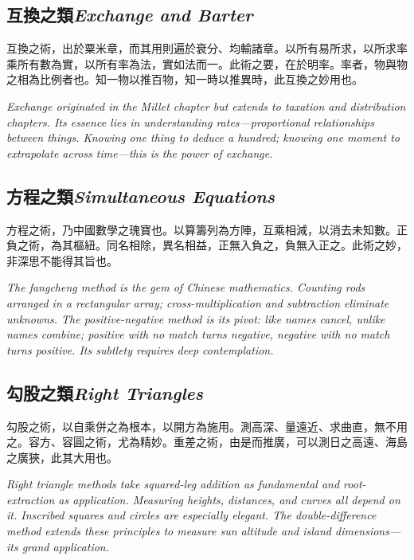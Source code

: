 \documentclass[10pt,a4paper]{article}
\newcommand{\bilingual}[2]{%
  \par\smallskip\noindent
  \begin{minipage}[t]{0.48\textwidth}
    \setlength{\parindent}{0pt}
    \setlength{\parskip}{4pt plus 1pt minus 1pt}
    #1
  \end{minipage}%
  \hfill
  \begin{minipage}[t]{0.48\textwidth}
    \setlength{\parindent}{0pt}
    \setlength{\parskip}{4pt plus 1pt minus 1pt}
    \small\textit{#2}%
  \end{minipage}
  \par\smallskip
}
\begin{document}
\subsection*{互換之類\hfill\textnormal{\small\textit{Exchange and Barter}}}

\bilingual{%
互換之術，出於粟米章，而其用則遍於衰分、均輸諸章。以所有易所求，以所求率乘所有數為實，以所有率為法，實如法而一。此術之要，在於明率。率者，物與物之相為比例者也。知一物以推百物，知一時以推異時，此互換之妙用也。
}{%
Exchange originated in the Millet chapter but extends to taxation and distribution chapters. Its essence lies in understanding rates---proportional relationships between things. Knowing one thing to deduce a hundred; knowing one moment to extrapolate across time---this is the power of exchange.
}

\subsection*{方程之類\hfill\textnormal{\small\textit{Simultaneous Equations}}}

\bilingual{%
方程之術，乃中國數學之瑰寶也。以算籌列為方陣，互乘相減，以消去未知數。正負之術，為其樞紐。同名相除，異名相益，正無入負之，負無入正之。此術之妙，非深思不能得其旨也。
}{%
The fangcheng method is the gem of Chinese mathematics. Counting rods arranged in a rectangular array; cross-multiplication and subtraction eliminate unknowns. The positive-negative method is its pivot: like names cancel, unlike names combine; positive with no match turns negative, negative with no match turns positive. Its subtlety requires deep contemplation.
}

\subsection*{勾股之類\hfill\textnormal{\small\textit{Right Triangles}}}

\bilingual{%
勾股之術，以自乘併之為根本，以開方為施用。測高深、量遠近、求曲直，無不用之。容方、容圓之術，尤為精妙。重差之術，由是而推廣，可以測日之高遠、海島之廣狹，此其大用也。
}{%
Right triangle methods take squared-leg addition as fundamental and root-extraction as application. Measuring heights, distances, and curves all depend on it. Inscribed squares and circles are especially elegant. The double-difference method extends these principles to measure sun altitude and island dimensions---its grand application.
}

\newpage
\end{document}

